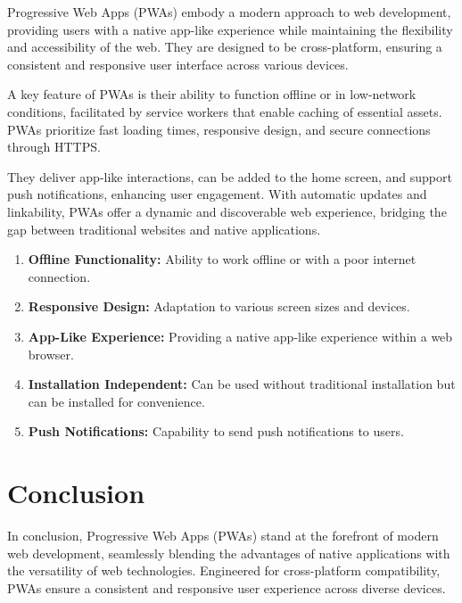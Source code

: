 \documentclass[12pt, a4paper, twoside]{article}
\begin{document}
Progressive Web Apps (PWAs) embody a modern approach to web development, providing users with a native app-like experience while maintaining the flexibility and accessibility of the web. They are designed to be cross-platform, ensuring a consistent and responsive user interface across various devices. \vspace{1em}

A key feature of PWAs is their ability to function offline or in low-network conditions, facilitated by service workers that enable caching of essential assets. PWAs prioritize fast loading times, responsive design, and secure connections through HTTPS. \vspace{1em}

They deliver app-like interactions, can be added to the home screen, and support push notifications, enhancing user engagement. With automatic updates and linkability, PWAs offer a dynamic and discoverable web experience, bridging the gap between traditional websites and native applications.

\begin{enumerate}
  \item \textbf{Offline Functionality:} Ability to work offline or with a poor internet connection.
  
  \item \textbf{Responsive Design:} Adaptation to various screen sizes and devices.
  
  \item \textbf{App-Like Experience:} Providing a native app-like experience within a web browser.
  
  \item \textbf{Installation Independent:} Can be used without traditional installation but can be installed for convenience.
  
  \item \textbf{Push Notifications:} Capability to send push notifications to users.
\end{enumerate}

\newpage

\section{Conclusion}
\label{sec:conclusion}


In conclusion, Progressive Web Apps (PWAs) stand at the forefront of modern web development, seamlessly blending the advantages of native applications with the versatility of web technologies. Engineered for cross-platform compatibility, PWAs ensure a consistent and responsive user experience across diverse devices.\vspace{1em}
\end{document}
